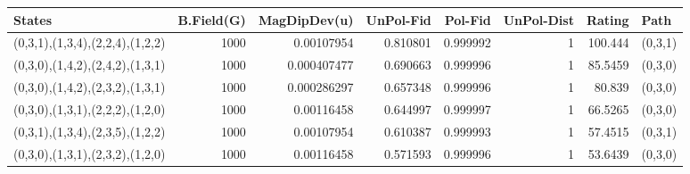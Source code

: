 \begin{tabular}{lrrrrrrl}
\hline
 States                          &   B.Field(G) &   MagDipDev(u) &   UnPol-Fid &   Pol-Fid &   UnPol-Dist &   Rating & Path    \\
\hline
 (0,3,1),(1,3,4),(2,2,4),(1,2,2) &         1000 &    0.00107954  &    0.810801 &  0.999992 &            1 & 100.444  & (0,3,1) \\
 (0,3,0),(1,4,2),(2,4,2),(1,3,1) &         1000 &    0.000407477 &    0.690663 &  0.999996 &            1 &  85.5459 & (0,3,0) \\
 (0,3,0),(1,4,2),(2,3,2),(1,3,1) &         1000 &    0.000286297 &    0.657348 &  0.999996 &            1 &  80.839  & (0,3,0) \\
 (0,3,0),(1,3,1),(2,2,2),(1,2,0) &         1000 &    0.00116458  &    0.644997 &  0.999997 &            1 &  66.5265 & (0,3,0) \\
 (0,3,1),(1,3,4),(2,3,5),(1,2,2) &         1000 &    0.00107954  &    0.610387 &  0.999993 &            1 &  57.4515 & (0,3,1) \\
 (0,3,0),(1,3,1),(2,3,2),(1,2,0) &         1000 &    0.00116458  &    0.571593 &  0.999996 &            1 &  53.6439 & (0,3,0) \\
\hline
\end{tabular}